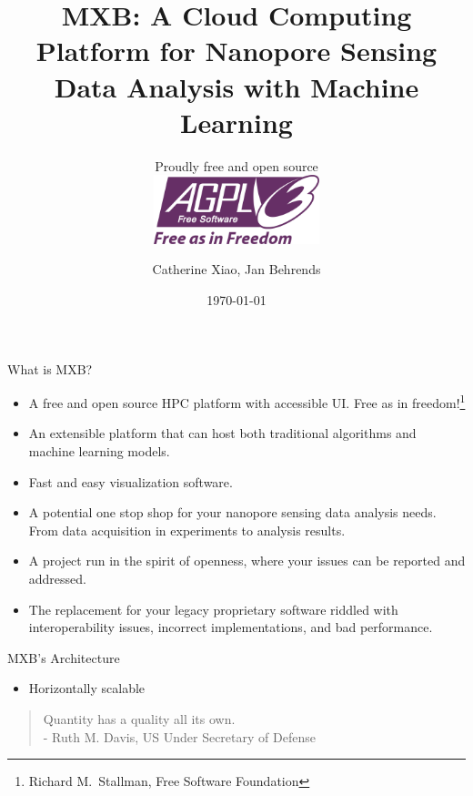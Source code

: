 \documentclass{beamer}
\title{MXB: A Cloud Computing Platform for Nanopore Sensing Data
Analysis with Machine Learning}
\subtitle{Proudly free and open source\\\vspace{2mm}
\centering\includegraphics[height=2cm]{assets/AGPL.png}}
\author{Catherine Xiao, Jan Behrends}
\institute{Institute of Physiology, University of Freiburg}
\date{\today}
\begin{document}
\begin{frame}
    \titlepage
\end{frame}

\begin{frame}{What is MXB?}
    \begin{itemize}
        \item A free and open source HPC platform with accessible UI. Free as in freedom!\footnote{Richard M.~Stallman, Free Software Foundation}\pause
        \item An extensible platform that can host both traditional algorithms and machine learning models.\pause
        \item Fast and easy visualization software.\pause
        \item A potential one stop shop for your nanopore sensing data analysis needs. From data acquisition in experiments to analysis results.\pause
        \item A project run in the spirit of openness, where your issues can be reported and addressed.\pause
        \item The replacement for your legacy proprietary software riddled with interoperability issues, incorrect implementations, and bad performance.
    \end{itemize}
\end{frame}

\begin{frame}{MXB's Architecture}
    \begin{itemize}
        \item Horizontally scalable\pause
    \end{itemize}
    \begin{quotation}
        Quantity has a quality all its own.\\
        - Ruth M. Davis, US Under Secretary of Defense
    \end{quotation}
\end{frame}
\end{document}
